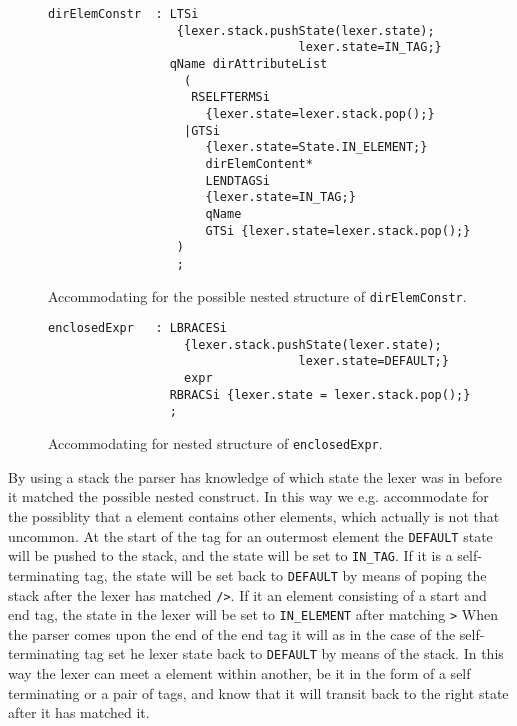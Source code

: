 \begin{figure}[h!]
\begin{verbatim}
dirElemConstr  : LTSi 
                  {lexer.stack.pushState(lexer.state); 
                                   lexer.state=IN_TAG;}
                 qName dirAttributeList
                   (
                    RSELFTERMSi
                      {lexer.state=lexer.stack.pop();}
                   |GTSi 
                      {lexer.state=State.IN_ELEMENT;}
                      dirElemContent* 
                      LENDTAGSi 
                      {lexer.state=IN_TAG;}
                      qName 
                      GTSi {lexer.state=lexer.stack.pop();}
                  )
                  ;
\end{verbatim}
\caption[Accommodating for a nested structure of \texttt{dirElemConstr}]{Accommodating for the possible nested structure of \texttt{dirElemConstr}.}
\label{fig:nestedTransitionElement}
\end{figure}

\begin{figure}[h!]
\begin{verbatim}
enclosedExpr   : LBRACESi 
                   {lexer.stack.pushState(lexer.state); 
                                   lexer.state=DEFAULT;}
                   expr 
                 RBRACSi {lexer.state = lexer.stack.pop();}
                 ;
\end{verbatim}
\caption[Accommodating for nested structure of \texttt{enclosedExpr}]{Accommodating for nested structure of \texttt{enclosedExpr}.}
\label{fig:nestedTransitionExpr}
\end{figure}

By using a stack the parser has knowledge of which state the lexer was in before it matched the possible nested construct. In this way we e.g. accommodate for the possiblity that a element contains other elements, which actually is not that uncommon. At the start of the tag for an outermost element the \verb!DEFAULT! state will be pushed to the stack, and the state will be set to \verb!IN_TAG!. If it is a self-terminating tag, the state will be set back to \verb!DEFAULT! by means of poping the stack after the lexer has matched \verb!/>!. If it an element consisting of a start and end tag, the state in the lexer will be set to \verb!IN_ELEMENT! after matching \verb!>! When the parser comes upon the end of the end tag it will as in the case of the self-terminating tag set he lexer state back to \verb!DEFAULT! by means of the stack. In this way the lexer can meet a element within another, be it in the form of a self terminating or a pair of tags, and know that it will transit back to the right state after it has matched it.

